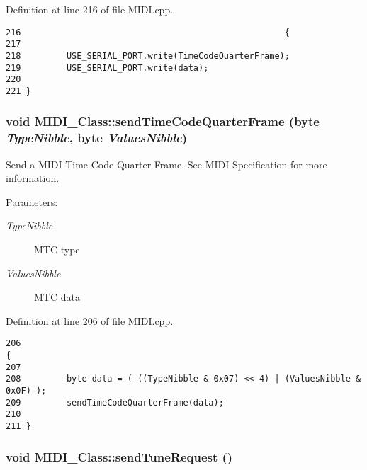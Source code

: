 Definition at line 216 of file MIDI.cpp.

\begin{Code}\begin{verbatim}216                                                    {
217         
218         USE_SERIAL_PORT.write(TimeCodeQuarterFrame);
219         USE_SERIAL_PORT.write(data);
220         
221 }
\end{verbatim}
\end{Code}


\hypertarget{class_m_i_d_i___class_d9b1bd53330652f0360a0a6ed80b5b9d}{
\subsubsection[{sendTimeCodeQuarterFrame}]{\setlength{\rightskip}{0pt plus 5cm}void MIDI\_\-Class::sendTimeCodeQuarterFrame ({\bf byte} {\em TypeNibble}, \/  {\bf byte} {\em ValuesNibble})}}
\label{class_m_i_d_i___class_d9b1bd53330652f0360a0a6ed80b5b9d}


Send a MIDI Time Code Quarter Frame. See MIDI Specification for more information. \begin{Desc}
\item[Parameters:]
\begin{description}
\item[{\em TypeNibble}]MTC type \item[{\em ValuesNibble}]MTC data \end{description}
\end{Desc}


Definition at line 206 of file MIDI.cpp.

\begin{Code}\begin{verbatim}206                                                                             {
207         
208         byte data = ( ((TypeNibble & 0x07) << 4) | (ValuesNibble & 0x0F) );
209         sendTimeCodeQuarterFrame(data);
210         
211 }
\end{verbatim}
\end{Code}


\hypertarget{class_m_i_d_i___class_9d9a51ca4a888c7c4c0d91a9e678c751}{
\subsubsection[{sendTuneRequest}]{\setlength{\rightskip}{0pt plus 5cm}void MIDI\_\-Class::sendTuneRequest ()}}
\label{class_m_i_d_i___class_9d9a51ca4a888c7c4c0d91a9e678c751}


